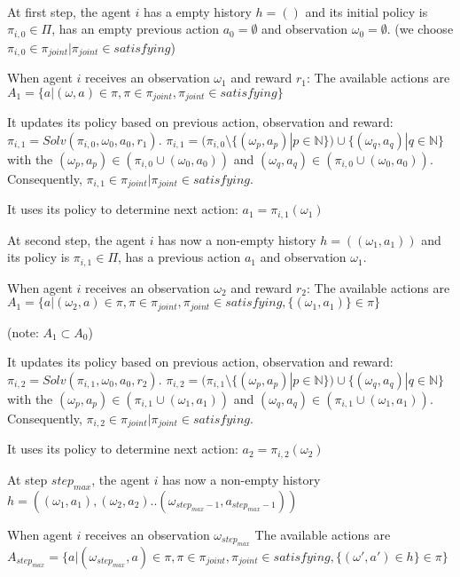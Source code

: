 \begin{proofoutline}
    \

    At first step, the agent $i$ has a empty history $h = ()$ and its initial policy is $\pi_{i,0} \in \Pi$, has an empty previous action $a_0 = \emptyset$ and observation $\omega_0 = \emptyset$.
    (we choose $\pi_{i,0} \in \pi_{joint} | \pi_{joint} \in satisfying$)

    When agent $i$ receives an observation $\omega_{1}$ and reward $r_1$:
    The available actions are $A_1 = \{a | (\omega, a) \in \pi, \pi \in \pi_{joint},\pi_{joint} \in satisfying\}$

    It updates its policy based on previous action, observation and reward: $\pi_{i,1} = Solv(\pi_{i,0}, \omega_0, a_0, r_1)$.
    $\pi_{i,1} = (\pi_{i,0} \setminus \{(\omega_p, a_p) | p \in \mathbb{N}\}) \cup \{(\omega_q, a_q) | q \in \mathbb{N}\}$ with the $(\omega_p, a_p) \in (\pi_{i,0} \cup {(\omega_0, a_0)})$ and $(\omega_q, a_q) \in (\pi_{i,0} \cup {(\omega_0, a_0)})$. Consequently, $\pi_{i,1} \in \pi_{joint} | \pi_{joint} \in satisfying$.


    It uses its policy to determine next action: $a_1 = \pi_{i,1}(\omega_1)$

    At second step, the agent $i$ has now a non-empty history $h = ((\omega_1, a_1))$ and its policy is $\pi_{i,1} \in \Pi$, has a previous action $a_1$ and observation $\omega_1$.

    When agent $i$ receives an observation $\omega_{2}$ and reward $r_2$:
    The available actions are $A_1 = \{a | (\omega_2, a) \in \pi, \pi \in \pi_{joint},\pi_{joint} \in satisfying, \{(\omega_1, a_1)\} \in \pi\}$

    (note: $A_1 \subset A_0$)

    It updates its policy based on previous action, observation and reward: $\pi_{i,2} = Solv(\pi_{i,1}, \omega_0, a_0, r_2)$.
    $\pi_{i,2} = (\pi_{i,1} \setminus \{(\omega_p, a_p) | p \in \mathbb{N}\}) \cup \{(\omega_q, a_q) | q \in \mathbb{N}\}$ with the $(\omega_p, a_p) \in (\pi_{i,1} \cup {(\omega_1, a_1)})$ and $(\omega_q, a_q) \in (\pi_{i,1} \cup {(\omega_1, a_1)})$. Consequently, $\pi_{i,2} \in \pi_{joint} | \pi_{joint} \in satisfying$.

    It uses its policy to determine next action: $a_2 = \pi_{i,2}(\omega_2)$

    At step $step_{max}$, the agent $i$ has now a non-empty history $h = ((\omega_1, a_1), (\omega_2, a_2)..(\omega_{step_{max}-1}, a_{step_{max}-1}))$

    When agent $i$ receives an observation $\omega_{step_{max}}$
    The available actions are $A_{step_{max}} = \{a | (\omega_{step_{max}}, a) \in \pi, \pi \in \pi_{joint},\pi_{joint} \in satisfying, \{(\omega', a') \in h\} \in \pi\}$


\end{proofoutline}
